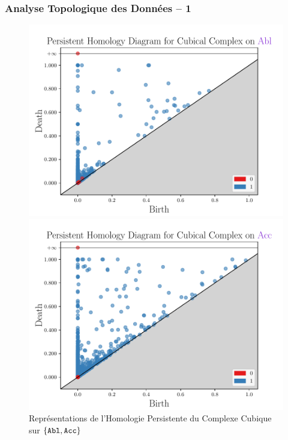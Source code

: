\documentclass[noamsthm]{beamercours}
\begin{document}
\begin{frame}
\frametitle{Analyse Topologique des Données -- 1}\label{subsub:tda}

\begin{figure}
\begin{minipage}{.45\textwidth}
	\begin{center}
	\includegraphics[width=\linewidth]{Figures/Visualisations/cc_Abl}
	\end{center}
\end{minipage}
\begin{minipage}{.45\textwidth}
	\begin{center}
	\includegraphics[width=\linewidth]{Figures/Visualisations/cc_Acc}
	\end{center}
\end{minipage}
\caption{Représentations de l'Homologie Persistente du Complexe Cubique sur $\{\tt Abl,Acc\}$}
\label{fig_cc_hom}
\end{figure}
\end{frame}
\end{document}
